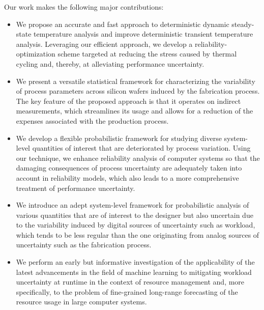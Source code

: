 Our work makes the following major contributions:

\begin{itemize}

\item
We propose an accurate and fast approach to deterministic dynamic steady-state
temperature analysis and improve deterministic transient temperature analysis.
Leveraging our efficient approach, we develop a reliability-optimization scheme
targeted at reducing the stress caused by thermal cycling and, thereby, at
alleviating performance uncertainty.

\item
We present a versatile statistical framework for characterizing the variability
of process parameters across silicon wafers induced by the fabrication process.
The key feature of the proposed approach is that it operates on indirect
measurements, which streamlines its usage and allows for a reduction of the
expenses associated with the production process.

\item
We develop a flexible probabilistic framework for studying diverse system-level
quantities of interest that are deteriorated by process variation. Using our
technique, we enhance reliability analysis of computer systems so that the
damaging consequences of process uncertainty are adequately taken into account
in reliability models, which also leads to a more comprehensive treatment of
performance uncertainty.

\item
We introduce an adept system-level framework for probabilistic analysis of
various quantities that are of interest to the designer but also uncertain due
to the variability induced by digital sources of uncertainty such as workload,
which tends to be less regular than the one originating from analog sources of
uncertainty such as the fabrication process.

\item
We perform an early but informative investigation of the applicability of the
latest advancements in the field of machine learning to mitigating workload
uncertainty at runtime in the context of resource management and, more
specifically, to the problem of fine-grained long-range forecasting of the
resource usage in large computer systems.

\end{itemize}
